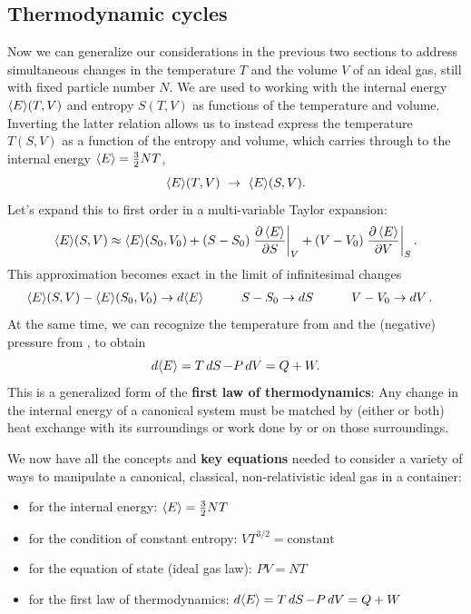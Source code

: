 \subsection{Thermodynamic cycles}
Now we can generalize our considerations in the previous two sections to address simultaneous changes in the temperature $T$ and the volume $V$ of an ideal gas, still with fixed particle number $N$.
We are used to working with the internal energy $\left\langle E \right\rangle\!(T, V)$ and entropy $S(T, V)$ as functions of the temperature and volume.
Inverting the latter relation allows us to instead express the temperature $T(S, V)$ as a function of the entropy and volume, which carries through to the internal energy $\left\langle E \right\rangle = \frac{3}{2}NT$,
\begin{equation*}
  \vev{E}\!(T, V) \ \to \ \vev{E}\!(S, V).
\end{equation*}
Let's expand this to first order in a multi-variable Taylor expansion:
\begin{equation*}
  \left\langle E \right\rangle\!(S, V) \approx \left\langle E \right\rangle\!(S_0, V_0) + (S - S_0) \left.\frac{\partial \left\langle E \right\rangle}{\partial S}\right|_V + (V - V_0) \left.\frac{\partial \left\langle E \right\rangle}{\partial V}\right|_S.
\end{equation*}
This approximation becomes exact in the limit of infinitesimal changes
\begin{align*}
  \left\langle E \right\rangle\!(S, V) - \left\langle E \right\rangle\!(S_0, V_0) & \to \mathop{d\!\left\langle E \right\rangle} \qquad &
  S - S_0 & \to \mathop{dS} \qquad &
  V - V_0 & \to \mathop{dV}. &
\end{align*}
At the same time, we can recognize the temperature from  and the (negative) pressure from , to obtain
\begin{equation}
  \label{eq:first_law}
  d\!\left\langle E \right\rangle = T \mathop{dS} - P \mathop{dV} = Q + W.
\end{equation}
This is a generalized form of the \textbf{first law of thermodynamics}: Any change in the internal energy of a canonical system must be matched by (either or both) heat exchange with its surroundings or work done by or on those surroundings.

\begin{shaded}
  We now have all the concepts and \textbf{key equations} needed to consider a variety of ways to manipulate a canonical, classical, non-relativistic ideal gas in a container: \\[-24 pt]
  \begin{itemize}
    \item {} for the internal energy: \hfill $\left\langle E \right\rangle = \frac{3}{2} NT$
    \item {} for the condition of constant entropy: \hfill $V T^{3/2} = \mbox{constant}$
    \item {} for the equation of state (ideal gas law): \hfill $PV = NT$
    \item {} for the first law of thermodynamics: \hfill $d\!\left\langle E \right\rangle = T \mathop{dS} - P \mathop{dV} = Q + W$
  \end{itemize}
\end{shaded}

